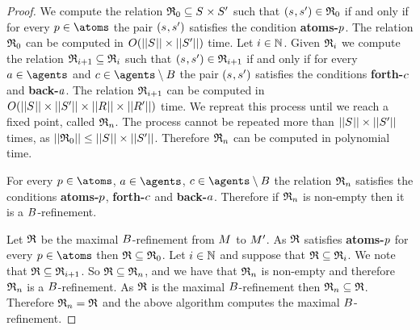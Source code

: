 \begin{proof}
We compute the relation $\refinement_0 \subseteq \kStates \times \kStatesP$ such that $(\kStateS, \kStateSP) \in \refinement_0$ if and only if for every $\atomP \in \atoms$ the pair $(\kStateS, \kStateSP)$ satisfies the condition {\bf atoms-$p$}.
The relation $\mathfrak{R}_0$ can be computed in $O(||\kStates|| \times ||\kStatesP||)$ time.
Let $i \in \mathbb{N}$.
Given $\mathfrak{R}_i$ we compute the relation $\mathfrak{R}_{i+1} \subseteq \mathfrak{R}_i$ such that $(\kStateS, \kStateSP) \in \refinement_{i+1}$ if and only if for every $\agentA \in \agents$ and $\agentC \in \agents \setminus \agentsB$ the pair $(\kStateS, \kStateSP)$ satisfies the conditions {\bf forth-$c$} and {\bf back-$a$}.
The relation $\mathfrak{R}_{i+1}$ can be computed in $O(||\kStates|| \times ||\kStatesP|| \times ||\kAccessibilityRel|| \times ||\kAccessibilityRelP||)$ time.
We repreat this process until we reach a fixed point, called $\mathfrak{R}_n$.
The process cannot be repeated more than $||\kStates|| \times ||\kStatesP||$ times, as $||\refinement_0|| \leq ||\kStates|| \times ||\kStatesP||$.
Therefore $\mathfrak{R}_n$ can be computed in polynomial time.

For every $\atomP \in \atoms$, $\agentA \in \agents$, $\agentC \in \agents \setminus \agentsB$ the relation $\mathfrak{R}_n$ satisfies the conditions {\bf atoms-$p$}, {\bf forth-$c$} and {\bf back-$a$}.
Therefore if $\mathfrak{R}_n$ is non-empty then it is a $B$-refinement.

Let $\mathfrak{R}$ be the maximal $B$-refinement from $\kModel$ to ${M^{\prime}_{}}$.
As $\mathfrak{R}$ satisfies {\bf atoms-$p$} for every $\atomP \in \atoms$ then $\mathfrak{R} \subseteq \mathfrak{R}_0$.
Let $i \in \mathbb{N}$ and suppose that $\mathfrak{R} \subseteq \mathfrak{R}_i$. 
We note that $\mathfrak{R} \subseteq \mathfrak{R}_{i + 1}$.
So $\mathfrak{R} \subseteq \mathfrak{R}_n$, and we have that $\mathfrak{R}_n$ is non-empty and therefore $\mathfrak{R}_n$ is a $B$-refinement.
As $\mathfrak{R}$ is the maximal $B$-refinement then $\mathfrak{R}_n \subseteq \mathfrak{R}$.
Therefore $\mathfrak{R}_n = \mathfrak{R}$ and the above algorithm computes the maximal $B$-refinement.
\end{proof}
